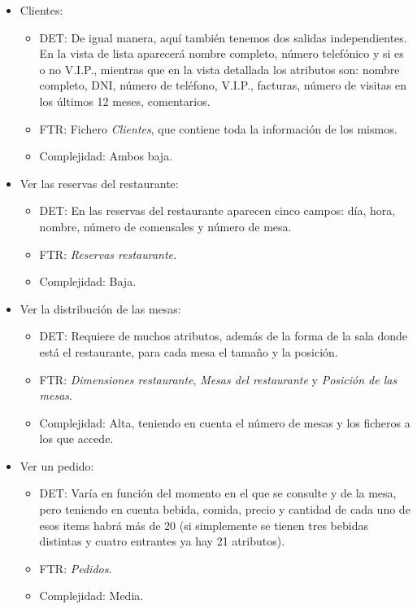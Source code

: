 \documentclass[spanish,a4paper,12pt]{report}	%
\begin{document}
\begin{itemize}
\begin{itemize}
		\end{itemize}
		\item{Clientes:} 
		\begin{itemize}
 			\item{DET:} De igual manera, aquí también tenemos dos salidas independientes. En la vista de lista aparecerá nombre completo, número telefónico y si es o no V.I.P., mientras que en la vista detallada los atributos son: nombre completo, DNI, número de teléfono, V.I.P., facturas, número de visitas en los últimos 12 meses, comentarios.
			\item{FTR:} Fichero \textit{Clientes}, que contiene toda la información de los mismos.
			\item{Complejidad:} Ambos baja.
		\end{itemize}
		\item{Ver las reservas del restaurante:} 
		\begin{itemize}
 			\item{DET:} En las reservas del restaurante aparecen cinco campos: día, hora, nombre, número de comensales y número de mesa.
			\item{FTR:} \textit{Reservas restaurante.}
			\item{Complejidad:} Baja.
		\end{itemize}
		\item{Ver la distribución de las mesas:} 
		\begin{itemize}
 			\item{DET:} Requiere de muchos atributos, además de la forma de la sala donde está el restaurante, para cada mesa el tamaño y la posición. 
			\item{FTR:} \textit{Dimensiones restaurante}, \textit{Mesas del restaurante} y \textit{Posición de las mesas}.
			\item{Complejidad:} Alta, teniendo en cuenta el número de mesas y los ficheros a los que accede.
		\end{itemize}
		\item{Ver un pedido:} 
		\begin{itemize}
 			\item{DET:} Varía en función del momento en el que se consulte y de la mesa, pero teniendo en cuenta bebida, comida, precio y cantidad de cada uno de esos items habrá más de 20 (si simplemente se tienen tres bebidas distintas y cuatro entrantes ya hay 21 atributos). 
			\item{FTR:} \textit{Pedidos}.
			\item{Complejidad:} Media.
		\end{itemize}

\end{itemize}
\end{document}
